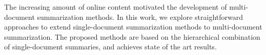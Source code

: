 The increasing amount of online content motivated the development of multi-document summarization methods. In this work, we explore straightforward approaches to extend single-document summarization methods to multi-document summarization. The proposed methods are based on the hierarchical combination of single-document summaries, and achieves state of the art results.
